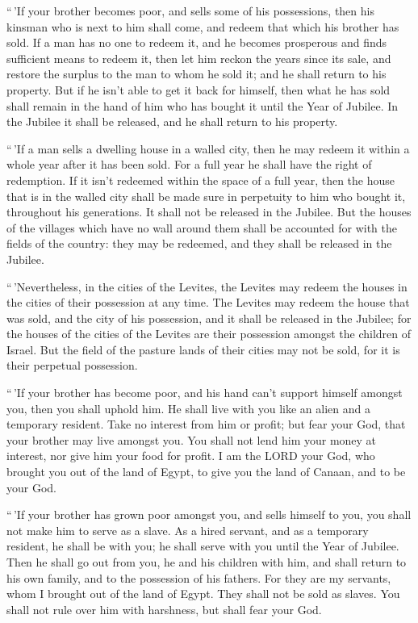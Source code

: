  ``\,'If your brother becomes poor, and sells some of his
possessions, then his kinsman who is next to him shall come, and redeem
that which his brother has sold.  If a man has no one to
redeem it, and he becomes prosperous and finds sufficient means to
redeem it,  then let him reckon the years since its sale,
and restore the surplus to the man to whom he sold it; and he shall
return to his property.  But if he isn't able to get it
back for himself, then what he has sold shall remain in the hand of him
who has bought it until the Year of Jubilee. In the Jubilee it shall be
released, and he shall return to his property.

 ``\,'If a man sells a dwelling house in a walled city,
then he may redeem it within a whole year after it has been sold. For a
full year he shall have the right of redemption.  If it
isn't redeemed within the space of a full year, then the house that is
in the walled city shall be made sure in perpetuity to him who bought
it, throughout his generations. It shall not be released in the Jubilee.
 But the houses of the villages which have no wall around
them shall be accounted for with the fields of the country: they may be
redeemed, and they shall be released in the Jubilee.

 ``\,'Nevertheless, in the cities of the Levites, the
Levites may redeem the houses in the cities of their possession at any
time.  The Levites may redeem the house that was sold,
and the city of his possession, and it shall be released in the Jubilee;
for the houses of the cities of the Levites are their possession amongst
the children of Israel.  But the field of the pasture
lands of their cities may not be sold, for it is their perpetual
possession.

 ``\,'If your brother has become poor, and his hand can't
support himself amongst you, then you shall uphold him. He shall live
with you like an alien and a temporary resident.  Take no
interest from him or profit; but fear your God, that your brother may
live amongst you.  You shall not lend him your money at
interest, nor give him your food for profit.  I am the
LORD your God, who brought you out of the land of Egypt, to give you the
land of Canaan, and to be your God.

 ``\,'If your brother has grown poor amongst you, and
sells himself to you, you shall not make him to serve as a slave.
 As a hired servant, and as a temporary resident, he
shall be with you; he shall serve with you until the Year of Jubilee.
 Then he shall go out from you, he and his children with
him, and shall return to his own family, and to the possession of his
fathers.  For they are my servants, whom I brought out of
the land of Egypt. They shall not be sold as slaves.  You
shall not rule over him with harshness, but shall fear your God.

